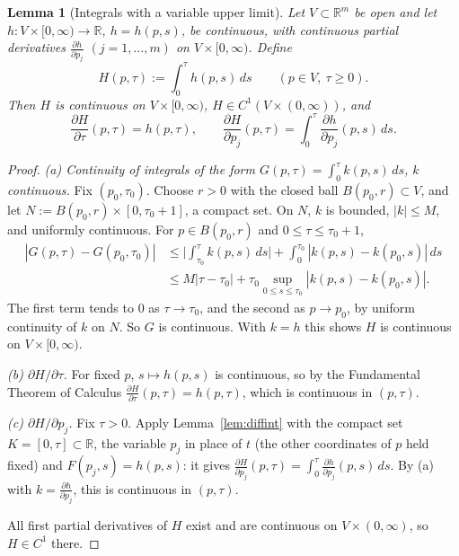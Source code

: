 \documentclass[11pt]{article}
\theoremstyle{plain}
\newtheorem{lemma}[theorem]{Lemma}
\theoremstyle{definition}
\theoremstyle{remark}
\begin{document}
\begin{lemma}[Integrals with a variable upper limit]\label{lem:leibniz}
Let $V \subset \mathbb{R}^m$ be open and let $h : V \times [0,\infty) \to \mathbb{R}$, $h = h(p,s)$, be continuous, with continuous partial derivatives $\frac{\partial h}{\partial p_j}$ $(j = 1,\dots,m)$ on $V \times [0,\infty)$. Define
$$ H(p,\tau) := \int_0^\tau h(p,s)\, ds \qquad (p \in V,\ \tau \geq 0). $$
Then $H$ is continuous on $V \times [0,\infty)$, $H \in C^1(V \times (0,\infty))$, and
$$ \frac{\partial H}{\partial \tau}(p,\tau) = h(p,\tau), \qquad \frac{\partial H}{\partial p_j}(p,\tau) = \int_0^\tau \frac{\partial h}{\partial p_j}(p,s)\, ds. $$
\end{lemma}
\begin{proof}
\emph{(a) Continuity of integrals of the form $G(p,\tau) = \int_0^\tau k(p,s)\,ds$, $k$ continuous.} Fix $(p_0,\tau_0)$. Choose $r > 0$ with the closed ball $B(p_0,r) \subset V$, and let $N := B(p_0,r) \times [0,\tau_0 + 1]$, a compact set. On $N$, $k$ is bounded, $|k| \leq M$, and uniformly continuous. For $p \in B(p_0,r)$ and $0 \le \tau \leq \tau_0 + 1$,
\begin{align*}
|G(p,\tau) - G(p_0,\tau_0)| &\leq \Big|\int_{\tau_0}^{\tau} k(p,s)\, ds\Big| + \int_0^{\tau_0}|k(p,s) - k(p_0,s)|\, ds \\
&\leq M|\tau - \tau_0| + \tau_0\sup_{0 \le s \le \tau_0}|k(p,s) - k(p_0,s)|.
\end{align*}
The first term tends to $0$ as $\tau \to \tau_0$, and the second as $p \to p_0$, by uniform continuity of $k$ on $N$. So $G$ is continuous. With $k = h$ this shows $H$ is continuous on $V \times [0,\infty)$.

\emph{(b) $\partial H/\partial\tau$.} For fixed $p$, $s \mapsto h(p,s)$ is continuous, so by the Fundamental Theorem of Calculus $\frac{\partial H}{\partial\tau}(p,\tau) = h(p,\tau)$, which is continuous in $(p,\tau)$.

\emph{(c) $\partial H/\partial p_j$.} Fix $\tau > 0$. Apply Lemma~\ref{lem:diffint} with the compact set $K = [0,\tau] \subset \mathbb{R}$, the variable $p_j$ in place of $t$ (the other coordinates of $p$ held fixed) and $F(p_j, s) = h(p,s)$: it gives $\frac{\partial H}{\partial p_j}(p,\tau) = \int_0^\tau \frac{\partial h}{\partial p_j}(p,s)\, ds$. By (a) with $k = \frac{\partial h}{\partial p_j}$, this is continuous in $(p,\tau)$.

All first partial derivatives of $H$ exist and are continuous on $V \times (0,\infty)$, so $H \in C^1$ there.
\end{proof}
\end{document}
